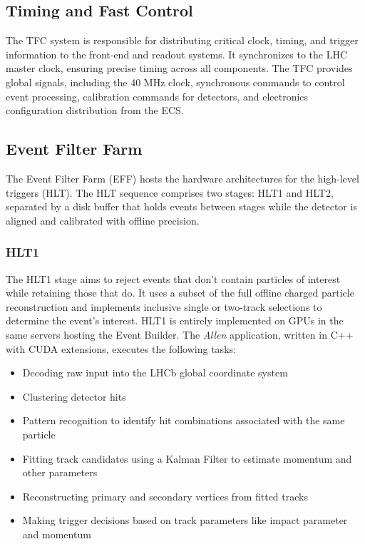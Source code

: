 \subsection{Timing and Fast Control}
The TFC system is responsible for distributing critical clock, timing, and trigger information to the front-end and readout systems. It synchronizes to the LHC master clock, ensuring precise timing across all components. The TFC provides global signals, including the 40 MHz clock, synchronous commands to control event processing, calibration commands for detectors, and electronics configuration distribution from the ECS.

\subsection{Event Filter Farm}
The Event Filter Farm (EFF) hosts the hardware architectures for the high-level triggers (HLT). The HLT sequence comprises two stages: HLT1 and HLT2, separated by a disk buffer that holds events between stages while the detector is aligned and calibrated with offline precision.
\subsubsection{HLT1}
The HLT1 stage aims to reject events that don't contain particles of interest while retaining those that do. It uses a subset of the full offline charged particle reconstruction and implements inclusive single or two-track selections to determine the event's interest. HLT1 is entirely implemented on GPUs in the same servers hosting the Event Builder. The \textit{Allen} application, written in C++ with CUDA extensions, executes the following tasks\cite{CERN-LHCC-2020-006}:
\begin{itemize}
\item Decoding raw input into the LHCb global coordinate system
\item Clustering detector hits
\item Pattern recognition to identify hit combinations associated with the same particle
\item Fitting track candidates using a Kalman Filter to estimate momentum and other parameters
\item Reconstructing primary and secondary vertices from fitted tracks
\item Making trigger decisions based on track parameters like impact parameter and momentum
\end{itemize}
